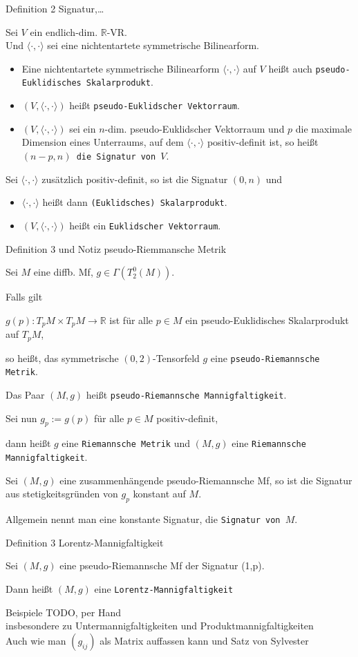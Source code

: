 \documentclass[a6paper,11pt,grid=front]{kartei}
\newcommand{\fl}[1]{\begin{flushleft}
 #1 \end{flushleft}}
\newcommand{\R}{\mathbb{R}}
\newcommand{\blf}[1]{\langle #1 \rangle}
\newcounter{def}
\begin{document}
\nonameyet
{Definition 2} {Signatur,\dots}
{
	\small
Sei $V$ ein endlich-dim. $\R$-VR.
\\
Und $\blf{\cdot,\cdot}$ sei eine nichtentartete symmetrische Bilinearform. 
\begin{itemize}[- ]
\item Eine nichtentartete symmetrische Bilinearform $\blf{\cdot,\cdot}$
auf $V$ heißt auch \texttt{pseudo-Euklidisches Skalarprodukt}.
\item $(V,\blf{\cdot,\cdot})$ heißt \texttt{pseudo-Euklidscher Vektorraum}.
\item $(V,\blf{\cdot,\cdot})$ sei ein $n$-dim. pseudo-Euklidscher Vektorraum 
und $p$ die maximale Dimension eines Unterraums, auf dem $\blf{\cdot,\cdot}$ 
positiv-definit ist, so heißt \texttt{$(n-p,n)$ die Signatur von $V$}.
\end{itemize}
Sei $\blf{\cdot,\cdot}$ zusätzlich positiv-definit, so ist die Signatur $(0,n)$ 
und
\begin{itemize}[-]
\item $\blf{\cdot,\cdot}$ heißt dann \texttt{(Euklidsches) Skalarprodukt}. 
\item $(V,\blf{\cdot,\cdot})$ heißt ein \texttt{Euklidscher Vektorraum}.
\end{itemize}
}
{}

\nonameyet
{\small Definition 3 und Notiz} {\small pseudo-Riemmansche Metrik}
{
\footnotesize
Sei $M$ eine diffb. Mf, $g\in \Gamma(T^0_2(M))$.
\fl{Falls gilt}
$g(p) : T_pM \times T_pM \to \R$  ist für alle $p\in M$
ein pseudo-Euklidisches Skalarprodukt auf $T_pM$,
\fl{so heißt, das symmetrische $(0,2)$-Tensorfeld $g$ eine 
\texttt{pseudo-Riemannsche Metrik}.}
\fl{Das Paar $(M,g)$ heißt \texttt{pseudo-Riemannsche Mannigfaltigkeit}.}
Sei nun $g_p := g(p)$ für alle $p\in M$ positiv-definit,
\fl{dann heißt $g$ eine \texttt{Riemannsche Metrik} und $(M,g)$ eine 
\texttt{Riemannsche Mannigfaltigkeit}.}
Sei $(M,g)$ eine zusammenhängende pseudo-Riemannsche Mf, so ist 
die Signatur aus stetigkeitsgründen von $g_p$ konstant auf $M$.
\fl{Allgemein nennt man eine konstante Signatur, die 
\texttt{Signatur von $M$}.}
}
{}

\nonameyet
{Definition 3} {Lorentz-Mannigfaltigkeit}
{
Sei $(M,g)$ eine pseudo-Riemannsche Mf der Signatur (1,p).
\fl{Dann heißt $(M,g)$ eine \texttt{Lorentz-Mannigfaltigkeit}}
}
{}

\nonameyet
{Beispiele} {}
{
TODO, per Hand
\\
insbesondere zu Untermannigfaltigkeiten und Produktmannigfaltigkeiten
\\
Auch wie man $(g_{ij})$ als Matrix auffassen kann und Satz von Sylvester
}
{}
\end{document}

